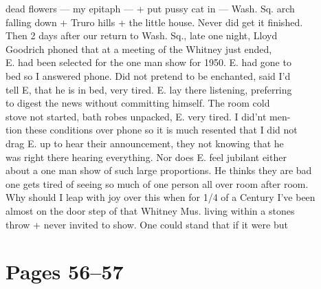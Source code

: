 \documentclass[11pt,a4paper]{article}
\begin{document}
{dead flowers --- my epitaph --- + put pussy cat in --- Wash. Sq. arch \\
falling down + Truro hills + the little house. Never did get it finished. \\
\quad Then 2 days after our return to Wash. Sq., late one night, Lloyd \\
Goodrich phoned that at a meeting of the Whitney just ended, \\
E. had been selected for the one man show for 1950. E. had gone to \\
bed so I answered phone. Did not pretend to be enchanted, said I'd \\
tell E, that he is in bed, very tired. E. lay there listening, preferring \\
to digest the news without committing himself. The room cold \\
stove not started, bath robes unpacked, E. very tired. I did'nt men- \\
tion these conditions over phone so it is much resented that I did not \\
drag E. up to hear their announcement, they not knowing that he \\
was right there hearing everything. Nor does E. feel jubilant either \\
about a one man show of such large proportions. He thinks they are bad \\
one gets tired of seeing so much of one person all over room after room. \\
Why should I leap with joy over this when for 1/4 of a Century I've been \\
almost on the door step of that Whitney Mus.  living within a stones \\
throw + never invited to show. One could stand that if it were but}



\section{Pages 56--57}
\end{document}
